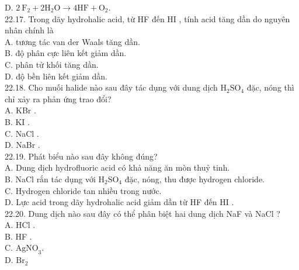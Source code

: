 \documentclass[10pt]{article}
\begin{document}
D. $2 \mathrm{~F}_{2}+2 \mathrm{H}_{2} \mathrm{O} \longrightarrow 4 \mathrm{HF}+\mathrm{O}_{2}$.\\
22.17. Trong dãy hydrohalic acid, từ HF đến HI , tính acid tăng dần do nguyên nhân chính là\\
A. tương tác van der Waals tăng dần.\\
B. độ phân cực liên kết giảm dần.\\
C. phân tử khối tăng dần.\\
D. độ bền liên kết giảm dần.\\
22.18. Cho muối halide nào sau đây tác dụng với dung dịch $\mathrm{H}_{2} \mathrm{SO}_{4}$ đặc, nóng thì chỉ xảy ra phản ứng trao đổi?\\
A. KBr .\\
B. KI .\\
C. NaCl .\\
D. NaBr .\\
22.19. Phát biểu nào sau đây không đúng?\\
A. Dung dịch hydrofluoric acid có khả năng ăn mòn thuỷ tinh.\\
B. NaCl rắn tác dụng với $\mathrm{H}_{2} \mathrm{SO}_{4}$ đặc, nóng, thu được hydrogen chloride.\\
C. Hydrogen chloride tan nhiều trong nước.\\
D. Lực acid trong dãy hydrohalic acid giảm dần từ HF đến HI .\\
22.20. Dung dịch nào sau đây có thể phân biệt hai dung dịch NaF và NaCl ?\\
A. HCl .\\
B. HF .\\
C. $\mathrm{AgNO}_{3}$.\\
D. $\mathrm{Br}_{2}$
\end{document}
